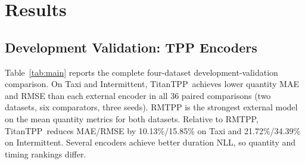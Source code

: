 \documentclass[runningheads]{llncs}
\newcommand{\method}{TitanTPP}
\begin{document}
\section{Results}
\subsection{Development Validation: TPP Encoders}
Table~\ref{tab:main} reports the complete four-dataset development-validation comparison. On Taxi
and Intermittent, \method\ achieves lower quantity MAE and RMSE than each
external encoder in all 36 paired comparisons (two datasets, six comparators,
three seeds). RMTPP is the strongest external model on the mean quantity
metrics for both datasets. Relative to RMTPP, \method\ reduces MAE/RMSE by
10.13\%/15.85\% on Taxi and 21.72\%/34.39\% on Intermittent. Several encoders
achieve better duration NLL, so quantity and timing rankings differ.
\end{document}
